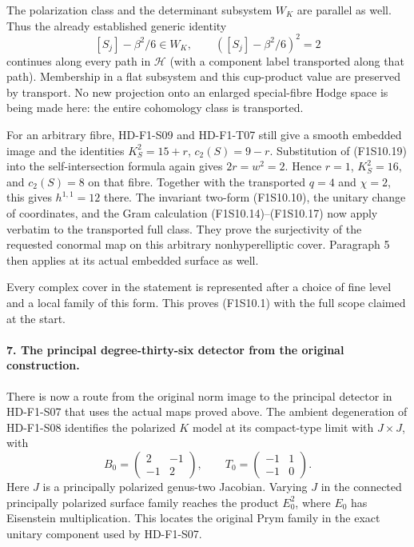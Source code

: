 The polarization class and the determinant subsystem
$W_K$ are parallel as well. Thus the already established
generic identity
\[
                [S_j]-\beta^2/6\in W_K,\qquad
                ([S_j]-\beta^2/6)^2=2
 \tag{F1S10.19}
\]
continues along every path in $\mathcal H$ (with a
component label transported along that path).
Membership in a flat subsystem and this cup-product
value are preserved by transport. No new projection
onto an enlarged special-fibre Hodge space is being
made here: the entire cohomology class is transported.

For an arbitrary fibre, HD-F1-S09 and HD-F1-T07 still
give a smooth embedded image and the identities
$K_S^2=15+r$, $c_2(S)=9-r$. Substitution of (F1S10.19)
into the self-intersection formula again gives
$2r=w^2=2$. Hence $r=1$, $K_S^2=16$, and $c_2(S)=8$
on that fibre. Together with the transported $q=4$
and $\chi=2$, this gives $h^{1,1}=12$ there.
The invariant two-form (F1S10.10), the unitary change
of coordinates, and the Gram calculation
(F1S10.14)--(F1S10.17) now apply verbatim to the
transported full class. They prove the surjectivity
of the requested conormal map on this arbitrary
nonhyperelliptic cover. Paragraph 5 then applies
at its actual embedded surface as well.

Every complex cover in the statement is represented
after a choice of fine level and a local family of
this form. This proves (F1S10.1) with the full scope
claimed at the start.

\paragraph{7. The principal degree-thirty-six detector from the original construction.}
There is now a route from the original norm image to
the principal detector in HD-F1-S07 that uses the
actual maps proved above. The ambient degeneration
of HD-F1-S08 identifies the polarized $K$ model at
its compact-type limit with $J\times J$, with
\[
 B_0=\begin{pmatrix}2&-1\\-1&2\end{pmatrix},\qquad
 T_0=\begin{pmatrix}-1&1\\-1&0\end{pmatrix}.
\]
Here $J$ is a principally polarized genus-two Jacobian.
Varying $J$ in the connected principally polarized
surface family reaches the product $E_0^2$, where
$E_0$ has Eisenstein multiplication. This locates
the original Prym family in the exact unitary
component used by HD-F1-S07.

